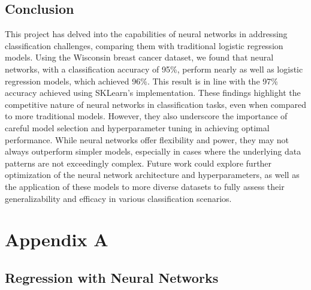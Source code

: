 \documentclass[twoside,11pt]{report}
\begin{document}
\section{Conclusion}
\label{sec:conclusion}

    
    This project has delved into the capabilities of neural networks in addressing classification challenges, 
    comparing them with traditional logistic regression models. Using the Wisconsin breast cancer dataset, we 
    found that neural networks, with a classification accuracy of 95\%, perform nearly as well as logistic regression 
    models, which achieved 96\%. This result is in line with the 97\% accuracy achieved using SKLearn's implementation.
    These findings highlight the competitive nature of neural networks in classification tasks, even when compared to 
    more traditional models. However, they also underscore the importance of careful model selection and hyperparameter 
    tuning in achieving optimal performance. While neural networks offer flexibility and power, they may not always 
    outperform simpler models, especially in cases where the underlying data patterns are not exceedingly complex.
    Future work could explore further optimization of the neural network architecture and hyperparameters, as well as 
    the application of these models to more diverse datasets to fully assess their generalizability and efficacy in 
    various classification scenarios.


    
    
     





















\clearpage 

\appendix
\renewcommand{\theHchapter}{appendix\Alph{chapter}}
\renewcommand{\theHsection}{appendix\thesection}

{}


\chapter*{Appendix A}
\label{app:appendixA}


\section{Regression with Neural Networks}
\label{sec:regression}
\end{document}
